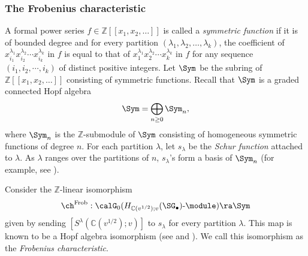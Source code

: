 \documentclass[12pt, reqno]{amsart}
\theoremstyle{plain}
\theoremstyle{definition}
\numberwithin{equation}{section}
\numberwithin{figure}{section}
\numberwithin{table}{section}
\def\Z{\mathbb Z}
\def\C{\mathbb C}
\begin{document}
\subsubsection{The Frobenius characteristic}\label{subsubsec: Frob char}
A formal power series $f \in \Z[[x_1, x_2, \ldots]]$ is called a \emph{symmetric function} if it is of bounded degree and for every partition $(\lambda_1, \lambda_2, \ldots, \lambda_k)$, the coefficient of $x_{i_1}^{\lambda_1} x_{i_2}^{\lambda_2} \cdots x_{i_k}^{\lambda_k}$ in $f$ is equal to that of  $x_{1}^{\lambda_1} x_{2}^{\lambda_2} \cdots x_{k}^{\lambda_k}$ in $f$ for any sequence $(i_1, i_2, \cdots, i_k)$ of distinct positive integers.
Let $\Sym$ be the subring of $\Z[[x_1, x_2, \ldots]]$ consisting of symmetric functions.
Recall that $\Sym$ is a graded connected Hopf algebra
\[
\Sym = \bigoplus_{n \geq 0} \Sym_n,
\]
where $\Sym_n$ is the $\Z$-submodule of $\Sym$ consisting of homogeneous symmetric functions of degree $n$.
For each partition $\lambda$, let $s_{\lambda}$ be the \emph{Schur function} attached to $\lambda$. 
As $\lambda$ ranges over the partitions of $n$,  $s_{\lambda}$'s  form a basis of $\Sym_n$ (for example, see \cite{97Ful, 99Stanley}).

Consider the $\Z$-linear isomorphism
\begin{align}\label{eq: Frob char}
\ch^{\rm Frob}: \calG_0(H_{\C(v^{1/2});v}(\SG_\bullet)\text{-}\module) \ra \Sym
\end{align}
given by sending
 $[S^\lambda(\C(v^{1/2});v)]$ to $s_\lambda$ for every partition $\lambda$.
This map is known to be a Hopf algebra isomorphism (see \cite[Theorem 5.7]{14WW} and \cite[Proposition 2.9(ii)]{21Korff}).
We call this isomorphism as  the \emph{Frobenius characteristic}.
\end{document}

